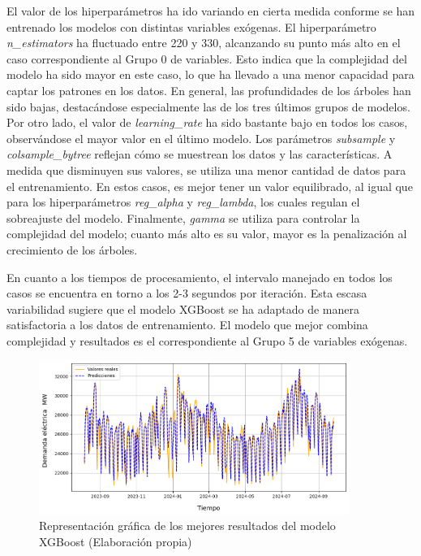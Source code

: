 \documentclass[12pt,a4paper]{report}
\begin{document}
El valor de los hiperparámetros ha ido variando en cierta medida conforme se han entrenado los modelos con distintas variables exógenas. El hiperparámetro \textit{n\_estimators} ha fluctuado entre 220 y 330, alcanzando su punto más alto en el caso correspondiente al Grupo 0 de variables. Esto indica que la complejidad del modelo ha sido mayor en este caso, lo que ha llevado a una menor capacidad para captar los patrones en los datos. En general, las profundidades de los árboles han sido bajas, destacándose especialmente las de los tres últimos grupos de modelos. Por otro lado, el valor de \textit{learning\_rate} ha sido bastante bajo en todos los casos, observándose el mayor valor en el último modelo. Los parámetros \textit{subsample} y \textit{colsample\_bytree} reflejan cómo se muestrean los datos y las características. A medida que disminuyen sus valores, se utiliza una menor cantidad de datos para el entrenamiento. En estos casos, es mejor tener un valor equilibrado, al igual que para los hiperparámetros \textit{reg\_alpha} y \textit{reg\_lambda}, los cuales regulan el sobreajuste del modelo. Finalmente, \textit{gamma} se utiliza para controlar la complejidad del modelo; cuanto más alto es su valor, mayor es la penalización al crecimiento de los árboles.

En cuanto a los tiempos de procesamiento, el intervalo manejado en todos los casos se encuentra en torno a los 2-3 segundos por iteración. Esta escasa variabilidad sugiere que el modelo XGBoost se ha adaptado de manera satisfactoria a los datos de entrenamiento. El modelo que mejor combina complejidad y resultados es el correspondiente al Grupo 5 de variables exógenas.

\begin{figure}[H]
    \centering
    \includegraphics[width=0.9\textwidth]{Images/tfm-4.4(xgboost).png}
    \caption{Representación gráfica de los mejores resultados del modelo XGBoost (Elaboración propia) }
    \label{fig:figura_XG}
\end{figure}
\end{document}
